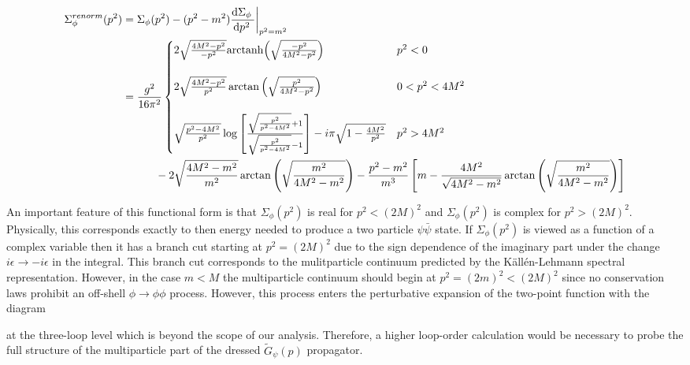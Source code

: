 \documentclass{article}
\begin{document}
\begin{align*}
\Sigma_\phi^{renorm}(p^2) & = \Sigma_\phi(p^2) - (p^2 - m^2) \frac{\mathrm{d}\Sigma_\phi \:}{\mathrm{d}p^2 \:} \bigg|_{p^2 = m^2} 
\\
& = 
\frac{g^2}{16 \pi^2}
\begin{cases}
2 \sqrt{\frac{4 M^2 - p^2}{-p^2}} \mathrm{arctanh}{\left(\sqrt{\frac{-p^2}{4 M^2 - p^2}}\right)} 
& p^2 < 0
\\
&
\\
2 \sqrt{\frac{4 M^2 - p^2}{p^2}} \arctan{\left( \sqrt{\frac{p^2}{4 M^2 - p^2}} \right)} 
& 0 < p^2 < 4 M^2 
\\
&
\\
\sqrt{\frac{p^2 - 4 M^2}{p^2}} \log{\left[ \frac{\sqrt{\frac{p^2}{p^2 - 4 M^2}} + 1}{\sqrt{\frac{p^2}{p^2 - 4 M^2}} - 1} \right]}  - i \pi \sqrt{1 - \frac{4 M^2}{p^2}}
& p^2 > 4 M^2
\end{cases}
\\ 
& \quad \quad \quad 
- 2 \sqrt{\frac{4 M^2 - m^2}{m^2}} \arctan{\left(\sqrt{\frac{m^2}{4 M^2 - m^2}}\right)}
- \frac{p^2 - m^2}{m^3} \left[ m - \frac{4 M^2}{\sqrt{4 M^2 - m^2}} \arctan{\left( \sqrt{\frac{m^2}{4 M^2 - m^2}} \right)} \right]
\end{align*}

An important feature of this functional form is that $\Sigma_\phi(p^2)$ is real for $p^2 < (2 M)^2$ and $\Sigma_\phi(p^2)$ is complex for $p^2 > (2 M)^2$. Physically, this corresponds exactly to then energy needed to produce a two particle $\psi \bar{\psi}$ state. If $\Sigma_\phi(p^2)$ is viewed as a function of a complex variable then it has a branch cut starting at $p^2 = (2 M)^2$ due to the sign dependence of the imaginary part under the change $i \epsilon \to - i \epsilon$ in the integral. This branch cut corresponds to the mulitparticle continuum predicted by the K{\"a}ll{\'e}n-Lehmann spectral representation. However, in the case $m < M$ the multiparticle continuum should begin at $p^2 = (2 m)^2 < (2 M)^2$ since no conservation laws prohibit an off-shell $\phi \to \phi \phi$ process. However, this process enters the perturbative expansion of the two-point function with the diagram
\begin{center}
\end{center}
at the three-loop level which is beyond the scope of our analysis. Therefore, a higher loop-order calculation would be necessary to probe the full structure of the multiparticle part of the dressed $\tilde{G}_{\psi}(p)$ propagator.  
\end{document}
